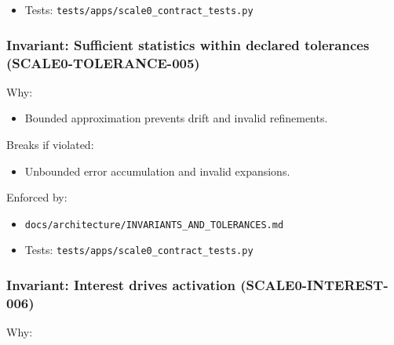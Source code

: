 \documentclass[9pt,a4paper,openany]{book}
\begin{document}
\begin{itemize}
\item Tests: \texttt{tests/\allowbreak{}apps/\allowbreak{}scale0\_\allowbreak{}contract\_\allowbreak{}tests.\allowbreak{}py}
\end{itemize}





\subsubsection{Invariant: Sufficient statistics within declared tolerances (SCALE0-TOLERANCE-005)}


Why:



\begin{itemize}
\item Bounded approximation prevents drift and invalid refinements.\allowbreak{}
\end{itemize}


Breaks if violated:



\begin{itemize}
\item Unbounded error accumulation and invalid expansions.\allowbreak{}
\end{itemize}


Enforced by:



\begin{itemize}
\item \texttt{docs/\allowbreak{}architecture/\allowbreak{}INVARIANTS\_\allowbreak{}AND\_\allowbreak{}TOLERANCES.\allowbreak{}md}
\end{itemize}


\begin{itemize}
\item Tests: \texttt{tests/\allowbreak{}apps/\allowbreak{}scale0\_\allowbreak{}contract\_\allowbreak{}tests.\allowbreak{}py}
\end{itemize}





\subsubsection{Invariant: Interest drives activation (SCALE0-INTEREST-006)}


Why:
\end{document}
